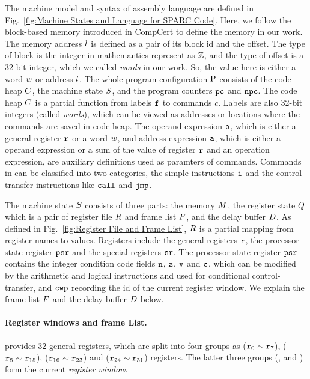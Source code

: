 The machine model and syntax of \sparc{} assembly language
are defined in Fig.~\ref{fig:Machine States and Language for SPARC Code}. 
Here, we follow the block-based memory \cite{CompCertMM} introduced 
in CompCert to define the memory in our work.   
The memory address $l$ is defined as a pair of 
its block id and the offset. The type of block is the integer 
in mathemantics represent as $\mathbb{Z}$, and the type of offset 
is a 32-bit integer, which we called {\it words} in our work. 
So, the value here is either a word $w$ or address $l$.  
The whole program configuration $\text{P}$ consists of the code heap
$C$, the machine state $S$, and the program counters $\texttt{pc}$
and $\texttt{npc}$.
The code heap $C$ is a partial function
from labels $\texttt{f}_{}$ to commands $c$.
Labels are also 32-bit integers (called {\em words}),
which can be viewed as addresses or locations 
where the commands are saved in code heap. 
The operand expression $\texttt{o}$, which is either a general 
register $\texttt{r}_{}$ or a word $w$, 
and address expression $\texttt{a}$, 
which is either a operand expression or a 
sum of the value of register $\texttt{r}_{}$ and an operation 
expression, are auxiliary definitions used as paramters of commands. 
Commands in \sparc{} can be classified into two categories,
the simple instructions $\texttt{i}$ and the
control-transfer instructions like $\texttt{call}$ and $\texttt{jmp}$.

The machine state $S$ consists of three parts:
the memory $M$, the register state $Q$
which is a pair of register file $R$ and frame list $F$,
and the delay buffer $D$.
As defined in Fig.~\ref{fig:Register File and Frame List},
$R$ is a partial mapping
from register names to values.
Registers include the general registers $\texttt{r}$,
the processor state register $\texttt{psr}$
and the special registers $\texttt{sr}$.
The processor state register $\texttt{psr}$ contains
the integer condition code fields $\texttt{n}$,
$\texttt{z}$, $\texttt{v}$ and $\texttt{c}$,
which can be modified by the arithmetic and logical instructions
and used for conditional control-transfer,
and $\texttt{cwp}$ recording the id of the current register window.
We explain the frame list $F$ and the delay buffer
$D$ below.

\paragraph{\textbf{Register windows and frame List.}}
\sparc{} provides 32 general registers, which are split into
four groups
as \globalRN{} ($\texttt{r}_{0} \sim \texttt{r}_{7}$),
\outRN{} ($\texttt{r}_{8} \sim \texttt{r}_{15}$), \localRN ($\texttt{r}_{16} \sim \texttt{r}_{23}$)
and \inRN{} ($\texttt{r}_{24} \sim \texttt{r}_{31}$) registers.
The latter three groups (\outRN{}, \localRN{} and \inRN{})
form the current {\em register window}.

